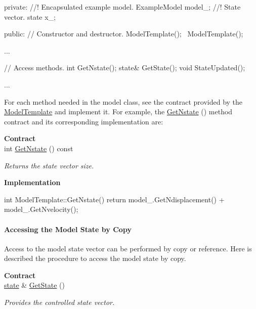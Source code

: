 \documentclass{tufte-book}
\begin{document}
\begin{enumerate}
\begin{frame_cpp}
{    private:
        //! Encapsulated example model.
        ExampleModel model_;
        //! State vector.
        state x_;

    public:
        // Constructor and destructor.
        ModelTemplate();
        ~ModelTemplate();

        ...

        // Access methods.
        int GetNstate();
        state& GetState();
        void StateUpdated();

	...
}
\end{frame_cpp}

For each method needed in the model class, see the contract provided by the  {\ttfamily  \hyperlink{model_template}{\-Model\-Template}} and implement it. For example, the
\hyperlink{class_verdandi_1_1_model_template_a44b42fdd4448173cbcb8c2b64733e534}{\-Get\-Nstate} () method  contract and its corresponding implementation are:

\textbf{Contract}\\

int \hyperlink{class_verdandi_1_1_model_template_a44b42fdd4448173cbcb8c2b64733e534}{\-Get\-Nstate} () const
\begin{DoxyCompactList}\small\item\em \-Returns the state vector size. \end{DoxyCompactList}


\textbf{Implementation}\\

\begin{frame_cpp}
    int ModelTemplate::GetNstate()
    {
        return model_.GetNdisplacement() + model_.GetNvelocity();
    }
\end{frame_cpp}


\paragraph{Accessing the Model State by Copy}

Access to the model state vector can be performed by copy or reference. Here is described the procedure to access the model state by copy.

\textbf{Contract}\\

\hyperlink{class_verdandi_1_1_model_template_a6bb9efb7898f067bb21780159b497ba7}{state} \& \hyperlink{class_verdandi_1_1_model_template_ae014bde61361001da52aab36d89f0048}{\-Get\-State} ()
\begin{DoxyCompactList}\small\item\em \-Provides the controlled state vector. \end{DoxyCompactList}



\end{enumerate}
\end{document}
